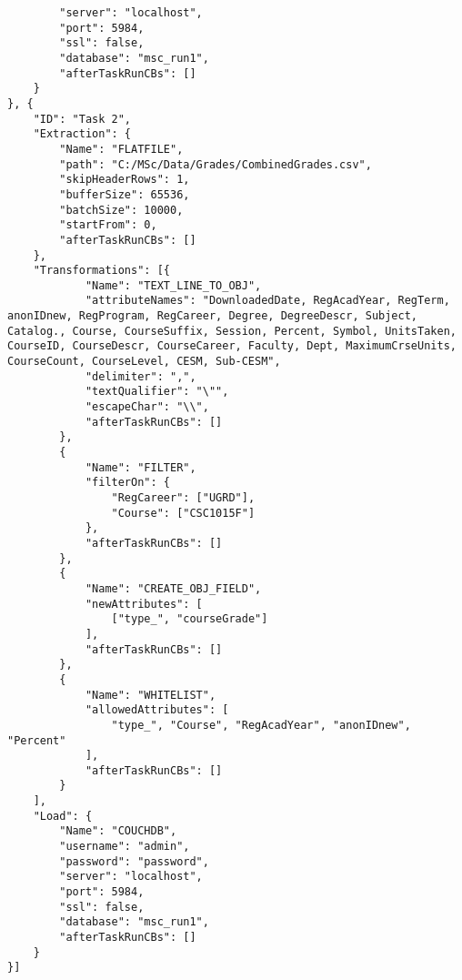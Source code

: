 \begin{verbatim}
        "server": "localhost",
        "port": 5984,
        "ssl": false,
        "database": "msc_run1",
        "afterTaskRunCBs": []
    }
}, {
    "ID": "Task 2",
    "Extraction": {
        "Name": "FLATFILE",
        "path": "C:/MSc/Data/Grades/CombinedGrades.csv",
        "skipHeaderRows": 1,
        "bufferSize": 65536,
        "batchSize": 10000,
        "startFrom": 0,
        "afterTaskRunCBs": []
    },
    "Transformations": [{
            "Name": "TEXT_LINE_TO_OBJ",
            "attributeNames": "DownloadedDate, RegAcadYear, RegTerm, anonIDnew, RegProgram, RegCareer, Degree, DegreeDescr, Subject, Catalog., Course, CourseSuffix, Session, Percent, Symbol, UnitsTaken, CourseID, CourseDescr, CourseCareer, Faculty, Dept, MaximumCrseUnits, CourseCount, CourseLevel, CESM, Sub-CESM",
            "delimiter": ",",
            "textQualifier": "\"",
            "escapeChar": "\\",
            "afterTaskRunCBs": []
        },
        {
            "Name": "FILTER",
            "filterOn": {
                "RegCareer": ["UGRD"],
                "Course": ["CSC1015F"]
            },
            "afterTaskRunCBs": []
        },
        {
            "Name": "CREATE_OBJ_FIELD",
            "newAttributes": [
                ["type_", "courseGrade"]
            ],
            "afterTaskRunCBs": []
        },
        {
            "Name": "WHITELIST",
            "allowedAttributes": [
                "type_", "Course", "RegAcadYear", "anonIDnew", "Percent"
            ],
            "afterTaskRunCBs": []
        }
    ],
    "Load": {
        "Name": "COUCHDB",
        "username": "admin",
        "password": "password",
        "server": "localhost",
        "port": 5984,
        "ssl": false,
        "database": "msc_run1",
        "afterTaskRunCBs": []
    }
}]
\end{verbatim}


